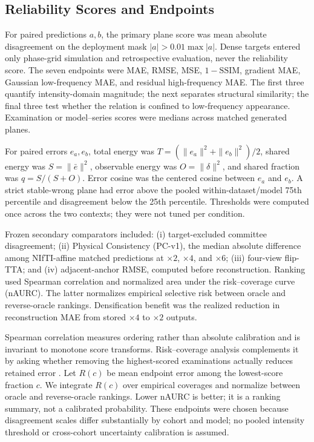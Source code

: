 \documentclass[journal,10pt]{IEEEtran}
\begin{document}
\subsection{Reliability Scores and Endpoints}
For paired predictions $a,b$, the primary plane score was mean absolute disagreement on the deployment mask $|a|>0.01\max|a|$. Dense targets entered only phase-grid simulation and retrospective evaluation, never the reliability score. The seven endpoints were MAE, RMSE, MSE, $1-\mathrm{SSIM}$, gradient MAE, Gaussian low-frequency MAE, and residual high-frequency MAE. The first three quantify intensity-domain magnitude; the next separates structural similarity; the final three test whether the relation is confined to low-frequency appearance. Examination or model--series scores were medians across matched generated planes.

For paired errors $e_a,e_b$, total energy was $T=(\|e_a\|^2+\|e_b\|^2)/2$, shared energy was $S=\|\bar e\|^2$, observable energy was $O=\|\delta\|^2$, and shared fraction was $q=S/(S+O)$. Error cosine was the centered cosine between $e_a$ and $e_b$. A strict stable-wrong plane had error above the pooled within-dataset/model 75th percentile and disagreement below the 25th percentile. Thresholds were computed once across the two contexts; they were not tuned per condition.

Frozen secondary comparators included: (i) target-excluded committee disagreement; (ii) Physical Consistency (PC-v1), the median absolute difference among NIfTI-affine matched predictions at $\times2$, $\times4$, and $\times6$; (iii) four-view flip-TTA; and (iv) adjacent-anchor RMSE, computed before reconstruction. Ranking used Spearman correlation and normalized area under the risk--coverage curve (nAURC). The latter normalizes empirical selective risk between oracle and reverse-oracle rankings. Densification benefit was the realized reduction in reconstruction MAE from stored $\times4$ to $\times2$ outputs.

Spearman correlation measures ordering rather than absolute calibration and is invariant to monotone score transforms. Risk--coverage analysis complements it by asking whether removing the highest-scored examinations actually reduces retained error \cite{geifman2019selectivenet,ding2020selective}. Let $R(c)$ be mean endpoint error among the lowest-score fraction $c$. We integrate $R(c)$ over empirical coverages and normalize between oracle and reverse-oracle rankings. Lower nAURC is better; it is a ranking summary, not a calibrated probability. These endpoints were chosen because disagreement scales differ substantially by cohort and model; no pooled intensity threshold or cross-cohort uncertainty calibration is assumed.
\end{document}
